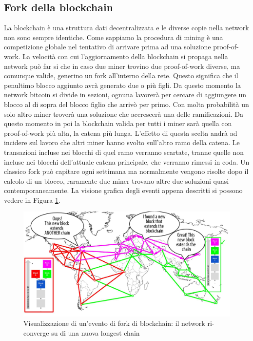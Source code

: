 \subsection{Fork della blockchain}
La blockchain è una struttura dati decentralizzata e le diverse copie nella network non sono sempre identiche. Come sappiamo la procedura di mining è una competizione globale nel tentativo di arrivare prima ad una soluzione proof-of-work. La velocità con cui l'aggiornamento della blockchain si propaga nella network può far si che in caso due miner trovino due proof-of-work diverse, ma comunque valide, generino un fork all'interno della rete. Questo significa che il penultimo blocco aggiunto avrà generato due o più figli. Da questo momento la network bitcoin si divide in sezioni, ognuna lavorerà per cercare di aggiungere un blocco al di sopra del blocco figlio che arrivò per primo. Con molta probabilità un solo altro miner troverà una soluzione che accrescerà una delle ramificazioni. Da questo momento in poi la blockchain valida per tutti i miner sarà quella con proof-of-work più alta, la catena più lunga. L'effetto di questa scelta andrà ad incidere sul lavoro che altri miner hanno svolto sull'altro ramo della catena. Le transazioni incluse nei blocchi di quel ramo verranno scartate, tranne quelle non incluse nei blocchi dell'attuale catena principale, che verranno rimessi in coda. Un classico fork può capitare ogni settimana ma normalmente vengono risolte dopo il calcolo di un blocco, raramente due miner trovano altre due soluzioni quasi contemporaneamente. La visione grafica degli eventi appena descritti si possono vedere in Figura \ref{fig:fork-blockchain}.
\begin{figure}
	\centering
	\includegraphics[width=1\linewidth]{Immagini/fork-blockchain}
	\caption[Visualizzazione di un'evento di fork di blockchain]{Visualizzazione di un'evento di fork di blockchain: il network ri-converge su di una nuova longest chain}
	\label{fig:fork-blockchain}
\end{figure}

